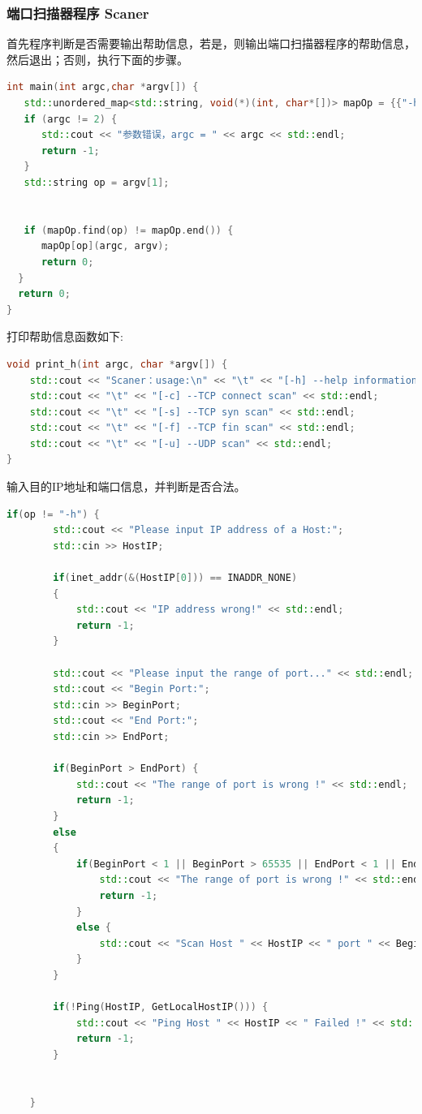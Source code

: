 \documentclass[UTF8,a4paper,10pt]{ctexart}
\begin{document}
\subsubsection{端口扫描器程序 Scaner}
首先程序判断是否需要输出帮助信息，若是，则输出端口扫描器程序的帮助信息，
然后退出；否则，执行下面的步骤。
\begin{lstlisting}[language = C++]
int main(int argc,char *argv[]) { 
   std::unordered_map<std::string, void(*)(int, char*[])> mapOp = {{"-h", print_h}, {"-c", print_c}, {"-s", print_s}, {"-u", print_u}, {"-f", print_f}};
   if (argc != 2) { 
      std::cout << "参数错误，argc = " << argc << std::endl;
      return -1;
   }
   std::string op = argv[1];


   if (mapOp.find(op) != mapOp.end()) {
      mapOp[op](argc, argv);
      return 0;
  }
  return 0;
}
\end{lstlisting}
打印帮助信息函数如下:
\begin{lstlisting}[language = C++]
void print_h(int argc, char *argv[]) {
    std::cout << "Scaner：usage:\n" << "\t" << "[-h] --help information " << std::endl;
    std::cout << "\t" << "[-c] --TCP connect scan" << std::endl;
    std::cout << "\t" << "[-s] --TCP syn scan" << std::endl;
    std::cout << "\t" << "[-f] --TCP fin scan" << std::endl;
    std::cout << "\t" << "[-u] --UDP scan" << std::endl;
}
\end{lstlisting}
输入目的IP地址和端口信息，并判断是否合法。
\begin{lstlisting}[language = C++]
    if(op != "-h") {
        std::cout << "Please input IP address of a Host:";
        std::cin >> HostIP;

        if(inet_addr(&(HostIP[0])) == INADDR_NONE)
        {
            std::cout << "IP address wrong!" << std::endl;
            return -1;
        }

        std::cout << "Please input the range of port..." << std::endl;
	    std::cout << "Begin Port:";
	    std::cin >> BeginPort;
	    std::cout << "End Port:";
	    std::cin >> EndPort;

        if(BeginPort > EndPort) {
            std::cout << "The range of port is wrong !" << std::endl;
            return -1;
        }
        else
        {
            if(BeginPort < 1 || BeginPort > 65535 || EndPort < 1 || EndPort > 65535) {
                std::cout << "The range of port is wrong !" << std::endl;
                return -1;
            }
            else {
                std::cout << "Scan Host " << HostIP << " port " << BeginPort << "~" << EndPort << " ..." << std::endl;
            }
        }

        if(!Ping(HostIP, GetLocalHostIP())) {
            std::cout << "Ping Host " << HostIP << " Failed !" << std::endl;
            return -1;
        }

    
    }
\end{lstlisting}
\end{document}
